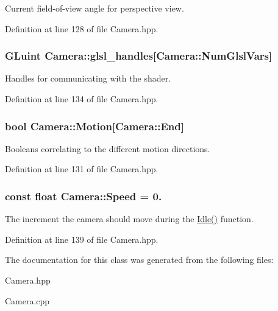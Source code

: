\-Current field-\/of-\/view angle for perspective view. 



\-Definition at line 128 of file \-Camera.\-hpp.

\hypertarget{class_camera_a1635486d7f9e0d52b241899a270ee335}{
\subsubsection[{glsl\-\_\-handles}]{\setlength{\rightskip}{0pt plus 5cm}\-G\-Luint {\bf \-Camera\-::glsl\-\_\-handles}\mbox{[}\-Camera\-::\-Num\-Glsl\-Vars\mbox{]}}}\label{class_camera_a1635486d7f9e0d52b241899a270ee335}


\-Handles for communicating with the shader. 



\-Definition at line 134 of file \-Camera.\-hpp.

\hypertarget{class_camera_a39746b4fadf30bba6bdc8aa6acfdc6f2}{
\subsubsection[{\-Motion}]{\setlength{\rightskip}{0pt plus 5cm}bool {\bf \-Camera\-::\-Motion}\mbox{[}\-Camera\-::\-End\mbox{]}}}\label{class_camera_a39746b4fadf30bba6bdc8aa6acfdc6f2}


\-Booleans correlating to the different motion directions. 



\-Definition at line 131 of file \-Camera.\-hpp.

\hypertarget{class_camera_aedf8ba8b2af631a5a3e33b19bfa40322}{
\subsubsection[{\-Speed}]{\setlength{\rightskip}{0pt plus 5cm}const float {\bf \-Camera\-::\-Speed} = 0.}}\label{class_camera_aedf8ba8b2af631a5a3e33b19bfa40322}


\-The increment the camera should move during the \hyperlink{class_camera_aec3559fe43597656629fdb00157d3c73}{\-Idle()} function. 



\-Definition at line 139 of file \-Camera.\-hpp.



\-The documentation for this class was generated from the following files\-:\begin{DoxyCompactItemize}
\item 
\-Camera.\-hpp\item 
\-Camera.\-cpp\end{DoxyCompactItemize}
